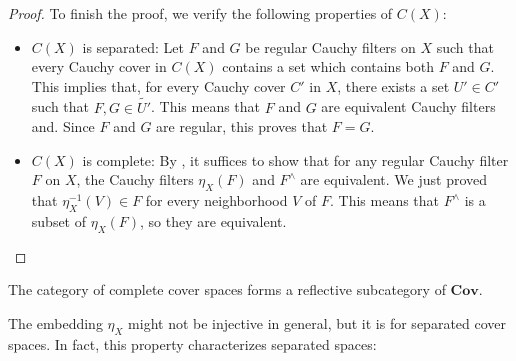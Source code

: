 \documentclass[pdflatex,sn-mathphys-num]{sn-jnl}
\theoremstyle{definition}
\theoremstyle{remark}
\numberwithin{figure}{section}
\newcommand{\cat}[1]{\mathbf{#1}}
\begin{document}
\begin{proof}
To finish the proof, we verify the following properties of $C(X)$:
\begin{itemize}
\item $C(X)$ is separated:
        Let $F$ and $G$ be regular Cauchy filters on $X$ such that every Cauchy cover in $C(X)$ contains a set which contains both $F$ and $G$.
        This implies that, for every Cauchy cover $C'$ in $X$, there exists a set $U' \in C'$ such that $F,G \in \widetilde{U'}$.
        This means that $F$ and $G$ are equivalent Cauchy filters and.
        Since $F$ and $G$ are regular, this proves that $F = G$.
\item $C(X)$ is complete:
        By , it suffices to show that for any regular Cauchy filter $F$ on $X$, the Cauchy filters $\eta_X(F)$ and $F^\wedge$ are equivalent.
        We just proved that $\eta_X^{-1}(V) \in F$ for every neighborhood $V$ of $F$.
        This means that $F^\wedge$ is a subset of $\eta_X(F)$, so they are equivalent.
\end{itemize}
\end{proof}

\begin{cor}
The category of complete cover spaces forms a reflective subcategory of $\cat{Cov}$.
\end{cor}

The embedding $\eta_X$ might not be injective in general, but it is for separated cover spaces.
In fact, this property characterizes separated spaces:
\end{document}
